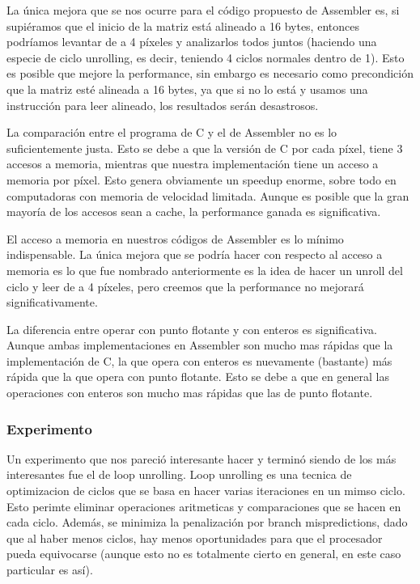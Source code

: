 La única mejora que se nos ocurre para el código propuesto de Assembler es, si supiéramos que el inicio de la matriz está alineado a 16 bytes, entonces podríamos levantar de a 4 píxeles y analizarlos todos juntos (haciendo una especie de ciclo unrolling, es decir, teniendo 4 ciclos normales dentro de 1).
Esto es posible que mejore la performance, sin embargo es necesario como precondición que la matriz esté alineada a 16 bytes, ya que si no lo está y usamos una instrucción para leer alineado, los resultados serán desastrosos.

La comparación entre el programa de C y el de Assembler no es lo suficientemente justa. Esto se debe a que la versión de C por cada píxel, tiene 3 accesos a memoria, mientras que nuestra implementación tiene un acceso a memoria por píxel. Esto genera obviamente un speedup enorme, sobre todo en computadoras con memoria de velocidad limitada.
Aunque es posible que la gran mayoría de los accesos sean a cache, la performance ganada es significativa.

El acceso a memoria en nuestros códigos de Assembler es lo mínimo indispensable. La única mejora que se podría hacer con respecto al acceso a memoria es lo que fue nombrado anteriormente es la idea de hacer un unroll del ciclo y leer de a 4 píxeles, pero creemos que la performance no mejorará significativamente.

La diferencia entre operar con punto flotante y con enteros es significativa. Aunque ambas implementaciones en Assembler son mucho mas rápidas que la implementación de C, la que opera con enteros es nuevamente (bastante) más rápida que la que opera con punto flotante. Esto se debe a que en general las operaciones con enteros son mucho mas rápidas que las de punto flotante.

\subsubsection*{Experimento}

Un experimento que nos pareció interesante hacer y terminó siendo de los más interesantes fue el de loop unrolling. Loop unrolling es una tecnica de optimizacion de ciclos que se basa en hacer varias iteraciones en un mimso ciclo.
Esto perimte eliminar operaciones aritmeticas y comparaciones que se hacen en cada ciclo. Además, se minimiza la penalización por branch mispredictions, dado que al haber menos ciclos, hay menos oportunidades para que el procesador pueda equivocarse (aunque esto no es totalmente cierto en general, en este caso particular es así).

